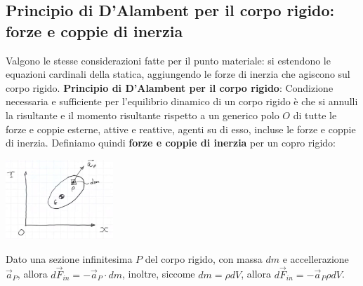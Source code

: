 \subsection{Principio di D'Alambent per il corpo rigido: forze e coppie di inerzia}
Valgono le stesse considerazioni fatte per il punto materiale: si estendono le equazioni cardinali della statica, aggiungendo le forze di inerzia che agiscono sul corpo rigido.\newline
\newline
\textbf{Principio di D'Alambent per il corpo rigido}:\newline
Condizione necessaria e sufficiente per l'equilibrio dinamico di un corpo rigido è che si annulli la risultante e il momento risultante rispetto a un generico polo $O$ di tutte le forze e coppie esterne, attive e reattive, agenti su di esso, incluse le forze e coppie di inerzia.\newline
\newline
Definiamo quindi \textbf{forze e coppie di inerzia} per un copro rigido:
\begin{center}
    \includegraphics[height=3cm]{../lezione9/img1.JPG}
\end{center}
Dato una sezione infinitesima $P$ del corpo rigido, con massa $dm$ e accellerazione $\vec{a}_P$, allora $d \vec{F}_{in} = - \vec{a}_P \cdot dm$, inoltre, siccome $dm = \rho dV$, allora $d \vec{F}_{in} = - \vec{a}_P \rho dV$.
